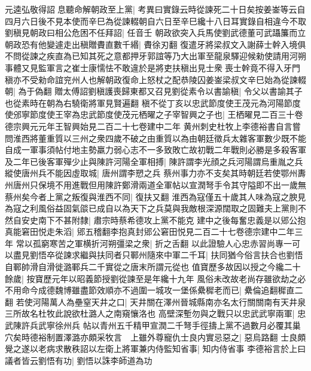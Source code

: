 元逵弘敬得詔息聽命解朝政至上黨|{
	考異曰實錄云時從諫死二十日矣按姜崟等云自四月六日後不見本使而辛巳為從諫輟朝自六日至辛巳纔十八日耳實錄自相違今不取}
劉稹見朝政曰相公危困不任拜詔|{
	任音壬}
朝政欲突入兵馬使劉武德董可武躡簾而立朝政恐有他變遽走出稹贈賮直數千緡|{
	賮徐刃翻}
復遣牙將梁叔文入謝薛士幹入境俱不問從諫之疾直為已知其死之意都押牙郭誼等乃大出軍至龍泉驛迎候勑使請用河朔事體又見監軍言之崔士康懦怯不敢違於是將吏扶稹出見士衆喪士幹竟不得入牙門稹亦不受勑命誼兖州人也解朝政復命上怒杖之配恭陵囚姜崟梁叔文辛巳始為從諫輟朝|{
	為于偽翻}
贈太傅詔劉稹護喪歸東都又召見劉從素令以書諭稹|{
	令父以書諭其子也從素時在朝為右驍衛將軍見賢遍翻}
稹不從丁亥以忠武節度使王茂元為河陽節度使邠寧節度使王宰為忠武節度使茂元栖曜之子宰智興之子也|{
	王栖曜見二百三十卷德宗興元元年王智興始見二百二十七卷建中二年}
黄州刺史杜牧上李德裕書自言嘗問淮西將董重質以三州之衆四歲不破之由重質以為由朝廷徵兵太雜客軍數少既不能自成一軍事須帖付地主勢羸力弱心志不一多致敗亡故初戰二年戰則必勝是多殺客軍及二年已後客軍殫少止與陳許河陽全軍相搏|{
	陳許謂李光顔之兵河陽謂烏重胤之兵}
縱使唐州兵不能因虛取城|{
	唐州謂李愬之兵}
蔡州事力亦不支矣其時朝廷若使鄂州夀州唐州只保境不用進戰但用陳許鄭滑兩道全軍帖以宣潤弩手令其守隘即不出一歲無蔡州矣今者上黨之叛復與淮西不同|{
	復扶又翻}
淮西為寇僅五十歲其人味為寇之腴見為寇之利風俗益固氣燄已成自以為天下之兵莫與我敵根深源闊取之固難夫上黨則不然自安史南下不甚附隸|{
	肅宗時蔡希德攻上黨不能克}
建中之後每奮忠義是以郳公抱真能窘田悦走朱滔|{
	郳五稽翻李抱真封郳公窘田悦見二百二十七卷德宗建中二年三年}
常以孤窮寒苦之軍横折河朔彊梁之衆|{
	折之舌翻}
以此證驗人心忠赤習尚專一可以盡見劉悟卒從諫求繼與扶同者只鄆州隨來中軍二千耳|{
	扶同猶今俗言扶合也劉悟自鄆帥滑自滑徙潞鄆兵二千實從之唐末所謂元從也}
值寶歷多故因以授之今纔二十餘歲|{
	按寶歷元年以昭義節授劉從諫至是年纔十九年}
風俗未改故老尚存雖欲劫之必不用命今成德魏博雖盡節效順亦不過圍一城攻一堡係纍穉老而已|{
	纍倫追翻穉直二翻}
若使河陽萬人為壘窒天井之口|{
	天井關在澤州晉城縣南亦名太行關關南有天井泉三所故名杜牧此說欲杜潞人之南窺懹洛也}
高壁深塹勿與之戰只以忠武武寧兩軍|{
	忠武陳許兵武寧徐州兵}
帖以青州五千精甲宣潤二千弩手徑擣上黨不過數月必覆其巢穴矣時德裕制置澤潞亦頗采牧言　上雖外尊寵仇士良内實忌惡之|{
	惡烏路翻}
士良頗覺之遂以老病求散秩詔以左衛上將軍兼内侍監知省事|{
	知内侍省事}
李德裕言於上曰議者皆云劉悟有功|{
	劉悟以誅李師道為功}


